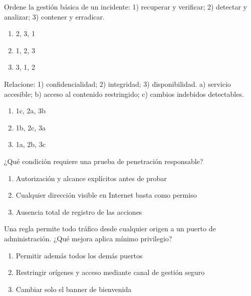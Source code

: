 \noindent\begin{minipage}{\linewidth}\setlength{\parskip}{4pt}\label{q:R-084}
Ordene la gestión básica de un incidente: 1) recuperar y verificar; 2) detectar y analizar; 3) contener y erradicar.
\begin{enumerate}[label=\Alph*),nosep]
\item 2, 3, 1
\item 1, 2, 3
\item 3, 1, 2
\end{enumerate}\end{minipage}\par\medskip

\noindent\begin{minipage}{\linewidth}\setlength{\parskip}{4pt}\label{q:R-085}
Relacione: 1) confidencialidad; 2) integridad; 3) disponibilidad. a) servicio accesible; b) acceso al contenido restringido; c) cambios indebidos detectables.
\begin{enumerate}[label=\Alph*),nosep]
\item 1c, 2a, 3b
\item 1b, 2c, 3a
\item 1a, 2b, 3c
\end{enumerate}\end{minipage}\par\medskip

\noindent\begin{minipage}{\linewidth}\setlength{\parskip}{4pt}\label{q:R-086}
¿Qué condición requiere una prueba de penetración responsable?
\begin{enumerate}[label=\Alph*),nosep]
\item Autorización y alcance explícitos antes de probar
\item Cualquier dirección visible en Internet basta como permiso
\item Ausencia total de registro de las acciones
\end{enumerate}\end{minipage}\par\medskip

\noindent\begin{minipage}{\linewidth}\setlength{\parskip}{4pt}\label{q:R-087}
Una regla permite todo tráfico desde cualquier origen a un puerto de administración. ¿Qué mejora aplica mínimo privilegio?
\begin{enumerate}[label=\Alph*),nosep]
\item Permitir además todos los demás puertos
\item Restringir orígenes y acceso mediante canal de gestión seguro
\item Cambiar solo el banner de bienvenida
\end{enumerate}\end{minipage}\par\medskip

